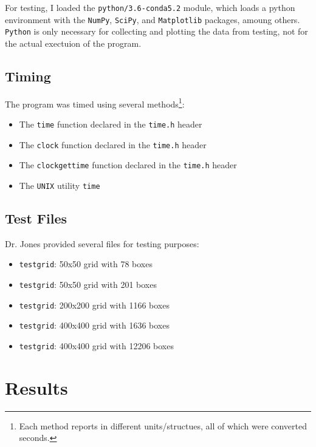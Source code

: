 \documentclass{article}
\begin{document}
For testing, I loaded the \texttt{python/3.6-conda5.2} module, which loads a
python environment with the \texttt{NumPy}, \texttt{SciPy}, and
\texttt{Matplotlib} packages, amoung others. \texttt{Python} is only necessary
for collecting and plotting the data from testing, not for the actual exectuion
of the program.

\subsection*{Timing}
\label{subsec:timing}

The program was timed using several methods\footnote{Each method reports in
different units/structues, all of which were converted seconds.}:

\begin{itemize}
    \item The \texttt{time} function declared in the \texttt{time.h} header
    \item The \texttt{clock} function declared in the \texttt{time.h} header
    \item The \texttt{clock\textunderscore gettime} function declared in the \texttt{time.h} header
    \item The \texttt{UNIX} utility \texttt{time}
\end{itemize}

\subsection*{Test Files}
\label{subsec:test_files}

Dr. Jones provided several files for testing purposes:

\begin{itemize}
    \item \texttt{testgrid}: 50x50 grid with 78 boxes
    \item \texttt{testgrid}: 50x50 grid with 201 boxes
    \item \texttt{testgrid}: 200x200 grid with 1166 boxes
    \item \texttt{testgrid}: 400x400 grid with 1636 boxes
    \item \texttt{testgrid}: 400x400 grid with 12206 boxes
\end{itemize}

\newpage
\section*{Results}
\label{sec:results}
\end{document}
